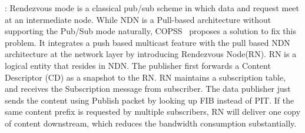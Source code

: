 \vspace{1mm}: Rendezvous mode is a classical pub/sub scheme in which data and request meet at an intermediate node. While NDN is a Pull-based architecture without supporting the Pub/Sub mode naturally,  COPSS~\cite{chen2011copss} proposes a solution to fix this problem. It integrates a push based multicast feature with the pull based NDN architecture at the network layer by introducing Rendezvous Node(RN). RN is a logical entity that resides in NDN. The publisher first forwards a Content Descriptor (CD) as a snapshot to the RN. RN maintains a subscription table, and receives the Subscription message from subscriber. The data publisher just sends the content using Publish packet by looking up FIB instead of PIT. If the same content prefix is requested by multiple subscribers, RN will deliver one copy  of content downstream, which reduces the bandwidth consumption substantially.

